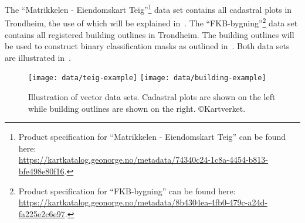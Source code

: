 The \enquote{Matrikkelen - Eiendomskart Teig}\footnote{Product specification for \enquote{Matrikkelen - Eiendomskart Teig} can be found here:\\\url{https://kartkatalog.geonorge.no/metadata/74340c24-1c8a-4454-b813-bfe498e80f16}.} data set contains all cadastral plots in Trondheim, the use of which will be explained in~.
The \enquote{FKB-bygning}\footnote{Product specification for \enquote{FKB-bygning} can be found here:\\\url{https://kartkatalog.geonorge.no/metadata/8b4304ea-4fb0-479c-a24d-fa225e2c6e97}.} data set contains all registered building outlines in Trondheim.
The building outlines will be used to construct binary classification masks as outlined in~.
Both data sets are illustrated in~.

\begin{figure}[htb]
  \texttt{[image: data/teig-example]}
  \texttt{[image: data/building-example]}
  \caption{%
    Illustration of vector data sets.
    Cadastral plots are shown on the left while building outlines are shown on the right.
    \copyright{Kartverket}.
  }%
  \label{fig:vector-data-example}
\end{figure}
